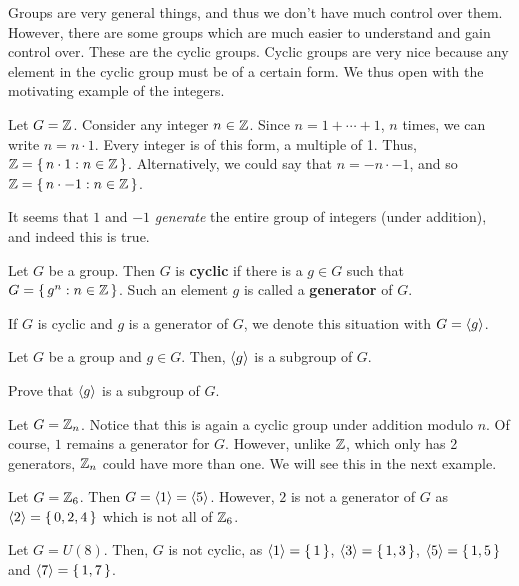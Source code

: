 \documentclass[./main.tex]{subfiles}
\begin{document}
Groups are very general things, and thus we don't have much control over them.
However, there are some groups which are much easier to understand and gain
control over. These are the cyclic groups. Cyclic groups are very nice because
any element in the cyclic group must be of a certain form. We thus open with the
motivating example of the integers. 
\begin{example}
    Let $G = \mathbb{Z}$. Consider any integer $n \in \mathbb{Z}$. Since $n = 1 + \cdots + 1$,
    $n$ times, we can write $n = n \cdot 1$. Every integer is of this form, a
    multiple of 1. Thus, $\mathbb{Z} = \set{n \cdot 1 : n \in \mathbb{Z}}$. Alternatively, we
    could say that $n = -n \cdot -1$, and so $\mathbb{Z} = \set{n \cdot -1: n \in
    \mathbb{Z}}$. 
\end{example}
It seems that $1$ and $-1$ \emph{generate} the entire group of integers (under
addition), and indeed this is true. 

\begin{definition}
    Let $G$ be a group. Then $G$ is \textbf{cyclic} if there is a $g \in G$ such
    that $G = \set{g^n : n \in \mathbb{Z}}$. Such an element $g$ is called a
    \textbf{generator} of $G$.
\end{definition}
If $G$ is cyclic and $g$ is a generator of $G$, we denote this situation with $G =
{ \langle g \rangle }$. 

\begin{example}
    Let $G$ be a group and $g \in G$. Then, ${ \langle g \rangle }$ is a subgroup of $G$.
\end{example}
\begin{exercise}
    Prove that ${ \langle g \rangle }$ is a subgroup of $G$.
\end{exercise}

\begin{example}
    Let $G = \mathbb{Z}_n$. Notice that this is again a cyclic group under addition
    modulo $n$. Of course, $1$ remains a generator for $G$. However, unlike
    $\mathbb{Z}$, which only has 2 generators, $\mathbb{Z}_n$ could have more than one. We
    will see this in the next example.
\end{example}

\begin{example}
    Let $G = \mathbb{Z}_6$. Then $G = { \langle 1 \rangle } = { \langle 5 \rangle }$. However, $2$ is not a
    generator of $G$ as ${ \langle 2 \rangle } = \set{0, 2, 4}$ which is not all of $\mathbb{Z}_6$.
\end{example}

\begin{example}
    Let $G = U(8)$. Then, $G$ is not cyclic, as ${ \langle 1 \rangle } = \set{1}$, ${ \langle 3 \rangle } =
    \set{1, 3}$, ${ \langle 5 \rangle } = \set{1,5}$ and ${ \langle 7 \rangle } = \set{1,7}$.
\end{example}
\end{document}
